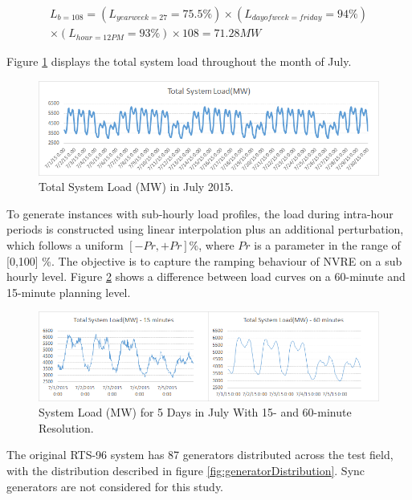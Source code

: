 \documentclass[12pt,LUDisStyle,twosided]{book}
\begin{document}
\begin{multline}
L_{b = 108} =  (L_{yearweek = 27} = 75.5\%) \times (L_{dayofweek = friday} = 94\%) 
\\ \times (L_{hour= 12 PM} = 93\%) \times 108 = 71.28MW
\end{multline}

Figure \ref{fig:totalSystemLoadJuly} displays the total system load throughout the month of July.

\begin{figure}[H] 
  \includegraphics[width=\textwidth,height=\textheight,keepaspectratio]{totalSystemLoadJuly.png}
  \caption{Total System Load (MW) in July 2015.}
  \label{fig:totalSystemLoadJuly}
\end{figure}

To generate instances with sub-hourly load profiles, the load during intra-hour periods is constructed using linear interpolation plus an additional perturbation, which follows a uniform $[-Pr,+Pr]\%$, where $Pr$ is a parameter in the range of [0,100] \%. The objective is to capture the ramping behaviour of NVRE on a sub hourly level. Figure \ref{fig:perturbationDifference} shows a difference between load curves on a 60-minute and 15-minute planning level. 

\begin{figure}[H] 
  \includegraphics[width=\textwidth,height=\textheight,keepaspectratio]{perturbationDifference.png}
  \caption{System Load (MW) for 5 Days in July With 15- and 60-minute Resolution.}
  \label{fig:perturbationDifference}
\end{figure}

The original RTS-96 system has 87 generators distributed across the test field, with the distribution described in figure \ref{fig:generatorDistribution}. Sync generators are not considered for this study.
\end{document}

